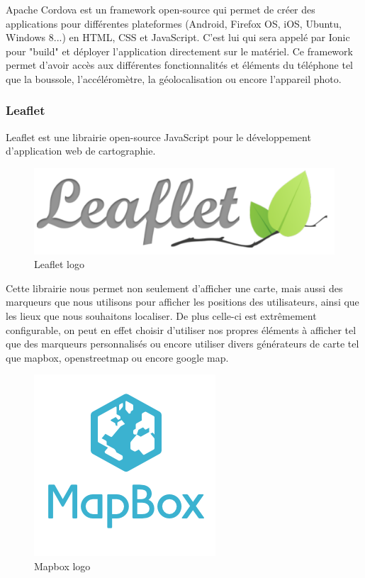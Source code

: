 \documentclass[french]{article}
\begin{document}
	Apache Cordova est un framework open-source qui permet de créer des applications pour différentes plateformes (Android, Firefox OS, iOS, Ubuntu, Windows 8...) en HTML, CSS et JavaScript. C'est lui qui sera appelé par Ionic pour "build" et déployer l'application directement sur le matériel.
	Ce framework permet d'avoir accès aux différentes fonctionnalités et éléments du téléphone tel que la boussole, l'accéléromètre, la géolocalisation ou encore l'appareil photo.
	
	\subsubsection{Leaflet}
	
	Leaflet est une librairie open-source JavaScript pour le développement d'application web de cartographie.
	
	\begin{figure}[H]
		\centering
		\includegraphics[scale=0.4]{../images/leaflet-logo.png}
		\caption{Leaflet logo}
		\label{Leaflet logo}
	\end{figure} 
	
	
	Cette librairie nous permet non seulement d'afficher une carte, mais aussi des marqueurs que nous utilisons pour afficher les positions des utilisateurs, ainsi que les lieux que nous souhaitons localiser. De plus celle-ci est extrêmement configurable, on peut en effet choisir d'utiliser nos propres éléments à afficher tel que des marqueurs personnalisés ou encore utiliser divers générateurs de carte tel que mapbox, openstreetmap ou encore google map.
	
	\begin{figure}[H]
		\centering
		\includegraphics[scale=0.4]{../images/mapbox-logo.png}
		\caption{Mapbox logo}
		\label{Mapbox logo}
	\end{figure} 
	
\end{document}
